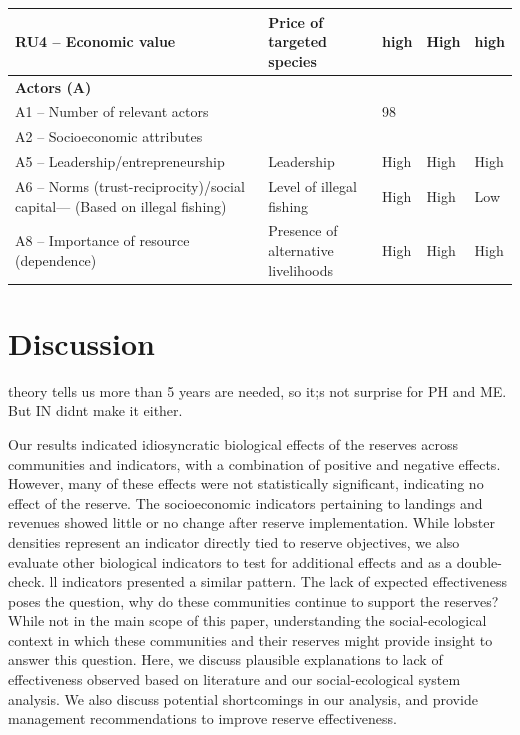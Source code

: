 \documentclass{frontiersSCNS}
\theoremstyle{definition}
\theoremstyle{definition}
\theoremstyle{definition}
\theoremstyle{remark}
\begin{document}
\begin{table}
\begin{tabular}[t]{>{\raggedright\arraybackslash}p{10em}|>{\raggedright\arraybackslash}p{10em}|l|l|l}
\hline
RU4 – Economic value & Price of targeted species & high & High & high\\
\hline
\textbf{Actors (A)} & \textbf{} & \textbf{} & \textbf{}\\
\hline
A1 – Number of relevant actors &  & 98 &  & \\
\hline
A2 – Socioeconomic attributes &  &  &  & \\
\hline
A5 – Leadership/entrepreneurship & Leadership & High & High & High\\
\hline
A6 – Norms (trust-reciprocity)/social capital--- (Based on illegal fishing) & Level of illegal fishing & High & High & Low\\
\hline
A8 – Importance of resource (dependence) & Presence of alternative livelihoods & High & High & High\\
\hline
\end{tabular}
\end{table}

\clearpage

\section{Discussion}\label{discussion}

theory tells us more than 5 years are needed, so it;s not surprise for
PH and ME. But IN didnt make it either.

Our results indicated idiosyncratic biological effects of the reserves
across communities and indicators, with a combination of positive and
negative effects. However, many of these effects were not statistically
significant, indicating no effect of the reserve. The socioeconomic
indicators pertaining to landings and revenues showed little or no
change after reserve implementation. While lobster densities represent
an indicator directly tied to reserve objectives, we also evaluate other
biological indicators to test for additional effects and as a
double-check. ll indicators presented a similar pattern. The lack of
expected effectiveness poses the question, why do these communities
continue to support the reserves? While not in the main scope of this
paper, understanding the social-ecological context in which these
communities and their reserves might provide insight to answer this
question. Here, we discuss plausible explanations to lack of
effectiveness observed based on literature and our social-ecological
system analysis. We also discuss potential shortcomings in our analysis,
and provide management recommendations to improve reserve effectiveness.
\end{document}
